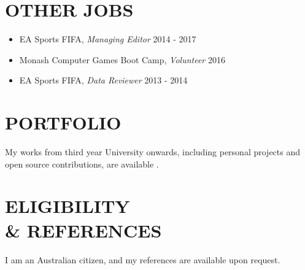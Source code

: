 \documentclass[margin, 11pt]{res} %
\begin{document}
\begin{resume}

\section{OTHER JOBS} 

\begin{itemize} \itemsep -11pt

\item EA Sports FIFA, {\sl Managing Editor} \hfill 2014 - 2017\\
\item Monash Computer Games Boot Camp, {\sl Volunteer} \hfill 2016 \\
\item EA Sports FIFA, {\sl Data Reviewer} \hfill 2013 - 2014 \\
 
\end{itemize}




\section{PORTFOLIO} 

My works from third year University onwards, including personal projects and open source contributions, are available \underline{}.





\section{ELIGIBILITY \\ \& REFERENCES} 

I am an Australian citizen, and my references are available upon request.

\end{resume}
\end{document}
